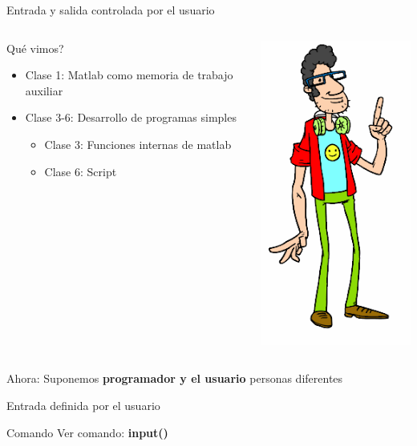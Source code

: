 \documentclass{bredelebeamer}
\begin{document}
\begin{frame}{Entrada y salida controlada por el usuario}
\begin{columns}
\begin{column}{0.5\textwidth}
Qué vimos?
\begin{itemize}
\item Clase 1: Matlab como memoria de trabajo auxiliar
\item Clase 3-6: Desarrollo de programas simples
\begin{itemize}
\item Clase 3: Funciones internas de matlab
\item Clase 6: Script
\end{itemize}
\end{itemize}
\end{column}
\begin{column}{0.5\textwidth}
\begin{center}
\includegraphics[scale=0.3]{images/img42.png}
\end{center}
\end{column}
\end{columns}
\begin{center}
Ahora: Suponemos \textbf{programador y el usuario} personas diferentes
\end{center}
\end{frame}

\begin{frame}{Entrada definida por el usuario}
\begin{exampleblock}{Comando}
Ver comando: \textbf{input()}
\end{exampleblock}
\end{frame}
\end{document}
